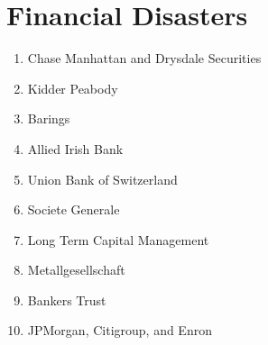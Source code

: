\section{Financial Disasters}

\begin{enumerate}
	\item Chase Manhattan and Drysdale Securities
	\item Kidder Peabody
	\item Barings
	\item Allied Irish Bank
	\item Union Bank of Switzerland
	\item Societe Generale
	\item Long Term Capital Management
	\item Metallgesellschaft
	\item Bankers Trust
	\item JPMorgan, Citigroup, and Enron
\end{enumerate}